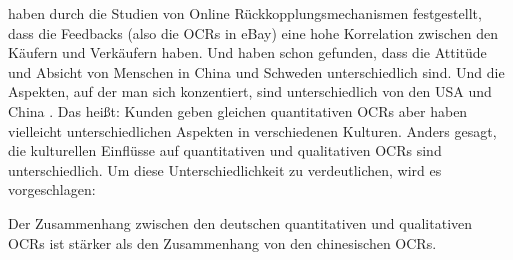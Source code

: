 \citeauthor{resnick2002trust} haben durch die Studien von Online Rückkopplungsmechanismen festgestellt, dass die Feedbacks (also die \ac{OCRs} in eBay) eine hohe Korrelation zwischen den Käufern und Verkäufern haben. Und \citeauthor{Stenberg2014} haben schon gefunden, dass die Attitüde und Absicht von Menschen in China und Schweden unterschiedlich sind. Und die Aspekten, auf der man sich konzentiert, sind unterschiedlich von den USA und China \citep{lu2015understanding}. Das heißt: Kunden geben gleichen quantitativen \ac{OCRs} aber  haben vielleicht unterschiedlichen Aspekten in verschiedenen Kulturen. Anders gesagt, die kulturellen Einflüsse auf quantitativen und qualitativen \ac{OCRs} sind unterschiedlich. Um diese Unterschiedlichkeit zu verdeutlichen, wird es vorgeschlagen:
\begin{hyp} 
Der Zusammenhang zwischen den deutschen quantitativen und qualitativen \acl{OCRs} ist stärker als den Zusammenhang von den chinesischen \acl{OCRs}.
\label{hyp:4}
\end{hyp}
